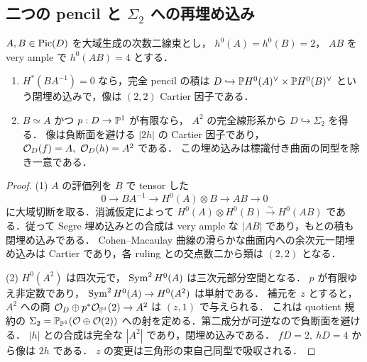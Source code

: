 \subsection{二つの pencil と \texorpdfstring{$\Sigma_2$}{Sigma 2} への再埋め込み}

\begin{lemma}
\label{lem:qa-core-two-pencils}
$A,B\in\operatorname{Pic}(D)$ を大域生成の次数二線束とし，
$h^0(A)=h^0(B)=2$，
$AB$ を very ample で $h^0(AB)=4$ とする．
\begin{enumerate}
\item $H^*(BA^{-1})=0$ なら，完全 pencil の積は
$D\hookrightarrow\mathbb P H^0(A)^\vee\times\mathbb P H^0(B)^\vee$
という閉埋め込みで，像は $(2,2)$ Cartier 因子である．
\item $B\simeq A$ かつ $p:D\to\mathbb P^1$ が有限なら，
$A^2$ の完全線形系から
$D\hookrightarrow\Sigma_2$ を得る．
像は負断面を避ける $|2h|$ の Cartier 因子であり，
$\OO_D(f)=A,\ \OO_D(h)=A^2$ である．
この埋め込みは標識付き曲面の同型を除き一意である．
\end{enumerate}
\end{lemma}
\begin{proof}
(1) $A$ の評価列を $B$ で tensor した
\[
 0\to BA^{-1}\to H^0(A)\otimes B\to AB\to0
\]
に大域切断を取る．消滅仮定によって
$H^0(A)\otimes H^0(B)\xrightarrow{\sim}H^0(AB)$
である．従って Segre 埋め込みとの合成は
very ample な $|AB|$ であり，もとの積も閉埋め込みである．
Cohen--Macaulay 曲線の滑らかな曲面内への余次元一閉埋め込みは
Cartier であり，各 ruling との交点数二から類は $(2,2)$ となる．

(2) $H^0(A^2)$ は四次元で，
$\operatorname{Sym}^2H^0(A)$ は三次元部分空間となる．
$p$ が有限ゆえ非定数であり，
$\operatorname{Sym}^2H^0(A)\to H^0(A^2)$ は単射である．
補元を $z$ とすると，$A^2$ への商
$\mathcal O_D\oplus p^*\mathcal O_{\mathbb P^1}(2)\to A^2$ は
$(z,1)$ で与えられる．
これは quotient 規約の
$\Sigma_2=\mathbb P_{\mathbb P^1}(\mathcal O\oplus\mathcal O(2))$
への射を定める．第二成分が可逆なので負断面を避ける．
$|h|$ との合成は完全な $|A^2|$ であり，閉埋め込みである．
$fD=2,\ hD=4$ から像は $2h$ である．
$z$ の変更は三角形の束自己同型で吸収される．
\end{proof}

